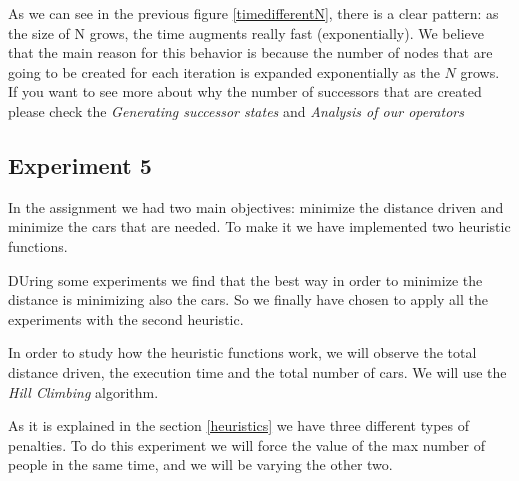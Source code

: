 \documentclass[12]{article}
\begin{document}
As we can see in the previous figure \ref{timedifferentN}, there is a clear pattern: as the size of N grows, the time augments really fast (exponentially). We believe that the main reason for this behavior is because the number of nodes that are going to be created for each iteration is expanded exponentially as the $N$ grows. If you want to see more about why the number of successors that are created please check the \textit{Generating successor states} and \textit{Analysis of our operators}



\subsection{Experiment 5}
In the assignment we had two main objectives: minimize the distance driven and minimize the cars that are needed. To make it we have implemented two heuristic functions. 

DUring some experiments we find that the best way in order to minimize the distance is minimizing also the cars. So we finally have chosen to apply all the experiments with the second heuristic.

In order to study how the heuristic functions work, we will observe the total distance driven, the execution time and the total number of cars. We will use the \textit{Hill Climbing} algorithm.

As it is explained in the section \ref{heuristics} we have three different types of penalties. To do this experiment we will force the value of the max number of people in the same time, and we will be varying the other two.

\end{document}
